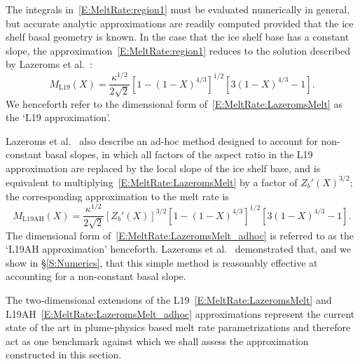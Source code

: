 \documentclass[openacc]{rsproca_new}%
\begin{document}
The integrals in~\eqref{E:MeltRate:region1} must be evaluated numerically in general, but accurate analytic approximations are readily computed provided that the ice shelf basal geometry is known. In the case that the ice shelf base has a constant slope, the approximation~\eqref{E:MeltRate:region1} reduces to the solution described by Lazeroms et al.~\cite{Lazeroms2019JPhysOcean}:
\begin{equation}\label{E:MeltRate:LazeromsMelt}
M_{\text{L19}}(X) = \frac{\kappa^{1/2}}{2\sqrt{2}}\left[1 - (1 - X)^{4/3}\right]^{1/2}\left[3(1-X)^{4/3} - 1\right].
\end{equation}
We henceforth refer to the dimensional form of~\eqref{E:MeltRate:LazeromsMelt} as the `L19 approximation'. 

Lazeroms et al.~\cite{Lazeroms2019JPhysOcean} also describe an ad-hoc method designed to account for non-constant basal slopes, in which all factors of the aspect ratio in the L19 approximation are replaced by the local slope of the ice shelf base, and is equivalent to multiplying~\eqref{E:MeltRate:LazeromsMelt} by a factor of $Z_b'(X)^{3/2}$; the corresponding approximation to the melt rate is
\begin{equation}\label{E:MeltRate:LazeromsMelt_adhoc}
M_{\text{L19AH}}(X) = \frac{\kappa^{1/2}}{2\sqrt{2}}\left[Z_b'(X)\right]^{3/2}\left[1 - (1 - X)^{4/3}\right]^{1/2}\left[3(1-X)^{4/3} - 1\right].
\end{equation}
The dimensional form of~\eqref{E:MeltRate:LazeromsMelt_adhoc} is referred to as the `L19AH approximation' henceforth. Lazeroms et al.~\cite{Lazeroms2019JPhysOcean} demonstrated that, and we show in \S\ref{S:Numerics}, that this simple method is reasonably effective at accounting for a non-constant basal slope.

The two-dimensional extensions of the L19~\eqref{E:MeltRate:LazeromsMelt} and L19AH~\eqref{E:MeltRate:LazeromsMelt_adhoc} approximations represent the current state of the art in plume-physics based melt rate parametrizations and therefore act as one benchmark against which we shall assess the approximation constructed in this section.
\end{document}
